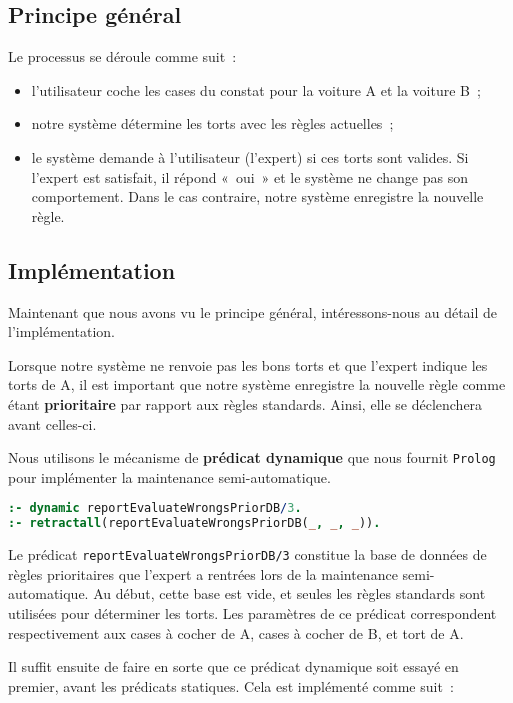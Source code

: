 \subsection{Principe général}
Le processus se déroule comme suit~:
\begin{itemize}
	\item l'utilisateur coche les cases du constat pour la voiture A et la voiture B~;
	\item notre système détermine les torts avec les règles actuelles~;
	\item le système demande à l'utilisateur (l'expert) si ces torts sont valides. Si l'expert est satisfait, il répond «~oui~» et le système ne change pas son comportement. Dans le cas contraire, notre système enregistre la nouvelle règle.
\end{itemize}

\subsection{Implémentation}
Maintenant que nous avons vu le principe général, intéressons-nous au détail de l'implémentation.

Lorsque notre système ne renvoie pas les bons torts et que l'expert indique les torts de A, il est important que notre système enregistre la nouvelle règle comme étant \textbf{prioritaire} par rapport aux règles standards. Ainsi, elle se déclenchera avant celles-ci.

Nous utilisons le mécanisme de \textbf{prédicat dynamique} que nous fournit \texttt{Prolog} pour implémenter la maintenance semi-automatique.

\begin{lstlisting}[language=Prolog,frame=single]
:- dynamic reportEvaluateWrongsPriorDB/3.
:- retractall(reportEvaluateWrongsPriorDB(_, _, _)).
\end{lstlisting}

Le prédicat \texttt{reportEvaluateWrongsPriorDB/3} constitue la base de données de règles prioritaires que l'expert a rentrées lors de la maintenance semi-automatique. Au début, cette base est vide, et seules les règles standards sont utilisées pour déterminer les torts. Les paramètres de ce prédicat correspondent respectivement aux cases à cocher de A, cases à cocher de B, et tort de A.

Il suffit ensuite de faire en sorte que ce prédicat dynamique soit essayé en premier, avant les prédicats statiques. Cela est implémenté comme suit~:

